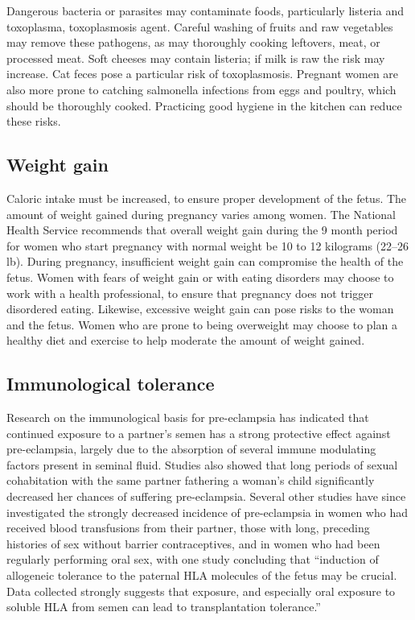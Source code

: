 \documentclass[12pt,a4paper,onecolumn]{article}
\begin{document}
Dangerous bacteria or parasites may contaminate foods, particularly listeria and toxoplasma,
toxoplasmosis agent. Careful washing of fruits and raw vegetables may remove these pathogens, as may
thoroughly cooking leftovers, meat, or processed meat. Soft cheeses may contain listeria; if milk is
raw the risk may increase. Cat feces pose a particular risk of toxoplasmosis. Pregnant women are
also more prone to catching salmonella infections from eggs and poultry, which should be thoroughly
cooked. Practicing good hygiene in the kitchen can reduce these risks.

\subsection{Weight gain}

Caloric intake must be increased, to ensure proper development of the fetus. The amount of weight
gained during pregnancy varies among women. The National Health Service recommends that overall
weight gain during the 9 month period for women who start pregnancy with normal weight be 10 to 12
kilograms (22–26 lb). During pregnancy, insufficient weight gain can compromise the health of the
fetus. Women with fears of weight gain or with eating disorders may choose to work with a health
professional, to ensure that pregnancy does not trigger disordered eating. Likewise, excessive
weight gain can pose risks to the woman and the fetus. Women who are prone to being overweight may
choose to plan a healthy diet and exercise to help moderate the amount of weight gained.

\subsection{Immunological tolerance}

Research on the immunological basis for pre-eclampsia has indicated that continued exposure to a
partner's semen has a strong protective effect against pre-eclampsia, largely due to the absorption
of several immune modulating factors present in seminal fluid. Studies also showed that long periods
of sexual cohabitation with the same partner fathering a woman's child significantly decreased her
chances of suffering pre-eclampsia. Several other studies have since investigated the strongly
decreased incidence of pre-eclampsia in women who had received blood transfusions from their
partner, those with long, preceding histories of sex without barrier contraceptives, and in women
who had been regularly performing oral sex, with one study concluding that ``induction of allogeneic
tolerance to the paternal HLA molecules of the fetus may be crucial. Data collected strongly
suggests that exposure, and especially oral exposure to soluble HLA from semen can lead to
transplantation tolerance.''
\end{document}
